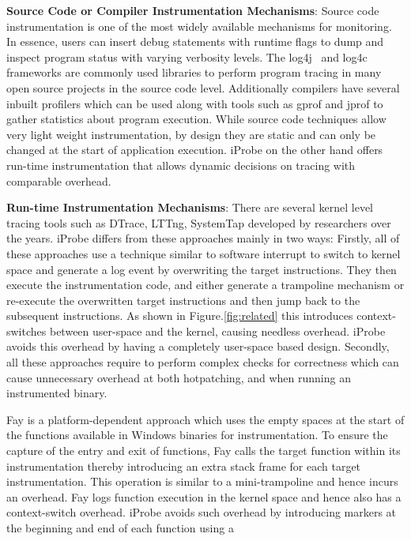 \noindent \textbf{Source Code or Compiler Instrumentation Mechanisms}: \quad
Source code instrumentation is one of the most widely available mechanisms for monitoring. 
In essence, users can insert debug statements with runtime flags to dump and inspect program status with varying verbosity levels. 
The log4j~\cite{log4j} and log4c~\cite{log4c} frameworks are commonly used libraries to perform program tracing in many open source projects in the source code level. 
Additionally compilers have several inbuilt profilers which can be used along with tools such as gprof and jprof to gather statistics about program execution.
While source code techniques allow very light weight instrumentation, by design they are static and can only be changed at the start of application execution. 
iProbe on the other hand offers run-time instrumentation that allows dynamic decisions on tracing with comparable overhead.


\noindent \textbf{Run-time Instrumentation Mechanisms}: \quad
There are several kernel level tracing tools such as DTrace, LTTng, SystemTap \cite{dtrace,lttng,systemtap} developed by researchers over the years.
iProbe differs from these approaches mainly in two ways: Firstly, all of these approaches use a technique similar to software interrupt to switch to kernel space and generate a log event by overwriting the target instructions. 
They then execute the instrumentation code, and either generate a trampoline mechanism or re-execute the overwritten target instructions and then jump back to the subsequent instructions. 
As shown in Figure.\ref{fig:related} this introduces context-switches between user-space and the kernel, causing needless overhead. 
iProbe avoids this overhead by having a completely user-space based design.
Secondly, all these approaches require to perform complex checks for correctness which can cause unnecessary overhead at both hotpatching, and when running an instrumented binary. 

Fay \cite{fay} is a platform-dependent approach which uses the empty spaces at the start of the functions available in Windows binaries for instrumentation. 
To ensure the capture of the entry and exit of functions, Fay calls the target function within its instrumentation thereby introducing an extra stack frame for each target instrumentation. 
This operation is similar to a mini-trampoline and hence incurs an overhead. 
Fay logs function execution in the kernel space and hence also has a context-switch overhead.
iProbe avoids such overhead by introducing markers at the beginning and end of
each function using a 

